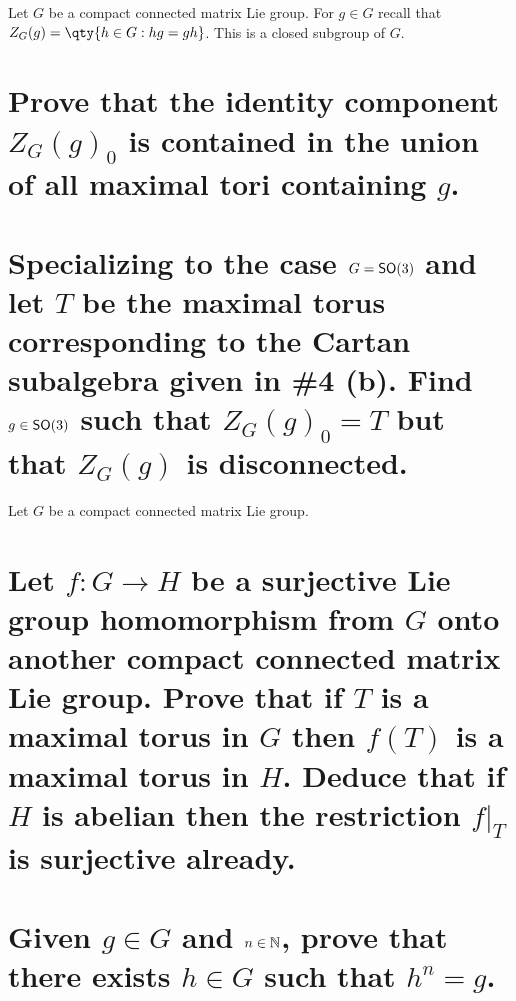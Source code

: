 \documentclass[
	pages,
	boxes,
	color=WildStrawberry
]{homework}
\begin{document}
\begin{problem}
Let $G$ be a compact connected matrix Lie group. For $g \in G$ recall that $Z_G(g) = \qty{h \in G : hg = gh}$. This is a closed subgroup of $G$.
\begin{parts}
	\part{Prove that the identity component $Z_G(g)_0$ is contained in the union of all maximal tori containing $g$.}\label{part:7a}
	\part{Specializing to the case $G = \mathsf{SO}(3) $ and let $T$ be the maximal torus corresponding to the Cartan subalgebra given in \textsf{\textbf{\#4}} (b). Find $g \in \mathsf{SO}(3)$ such that $Z_{G}(g)_{0} = T$ but that $Z_{G}(g)$ is disconnected.}\label{part:7b}
\end{parts}
\end{problem}


\begin{problem}
Let $G$ be a compact connected matrix Lie group.
\begin{parts}
	\part{Let $f: G \to H$ be a surjective Lie group homomorphism from $G$ onto another compact connected matrix Lie group. Prove that if $T$ is a maximal torus in $G$ then $f(T)$ is a maximal torus in $H$. Deduce that if $H$ is abelian then the restriction $f|_{T}$ is surjective already.}\label{part:8a}
	\part{Given $g \in G$ and $n \in \mathbb{N}$, prove that there exists $h \in G$ such that $h^n = g$.}\label{part:8b}
\end{parts}

\end{problem}

\begin{solution}
\end{solution}
\end{document}
